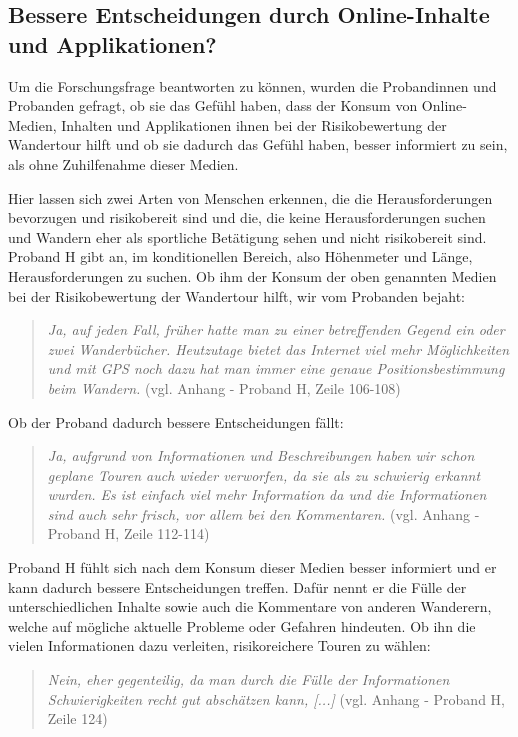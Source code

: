\subsection{Bessere Entscheidungen durch Online-Inhalte und Applikationen?}

Um die Forschungsfrage beantworten zu können, wurden die Probandinnen und Probanden gefragt, ob sie das Gefühl haben, dass der Konsum von Online-Medien, Inhalten und Applikationen ihnen bei der Risikobewertung der Wandertour hilft und ob sie dadurch das Gefühl haben, besser informiert zu sein, als ohne Zuhilfenahme dieser Medien.

Hier lassen sich zwei Arten von Menschen erkennen, die die Herausforderungen bevorzugen und risikobereit sind und die, die keine Herausforderungen suchen und Wandern eher als sportliche Betätigung sehen und nicht risikobereit sind. Proband H gibt an, im konditionellen Bereich, also Höhenmeter und Länge, Herausforderungen zu suchen. Ob ihm der Konsum der oben genannten Medien bei der Risikobewertung der Wandertour hilft, wir vom Probanden bejaht:

\begin{quote}
	\textit{\glqq Ja, auf jeden Fall, früher hatte man zu einer betreffenden Gegend ein oder zwei Wanderbücher. Heutzutage bietet das Internet viel mehr Möglichkeiten und mit GPS noch dazu hat man immer eine genaue Positionsbestimmung beim Wandern.\grqq} (vgl. Anhang - Proband H, Zeile 106-108)
\end{quote}

Ob der Proband dadurch bessere Entscheidungen fällt:

\begin{quote}
	\textit{\glqq Ja, aufgrund von Informationen und Beschreibungen haben wir schon geplane Touren auch wieder verworfen, da sie als zu schwierig erkannt wurden. Es ist einfach viel mehr Information da und die Informationen sind auch sehr frisch, vor allem bei den Kommentaren.\grqq} (vgl. Anhang - Proband H, Zeile 112-114)
\end{quote}

Proband H fühlt sich nach dem Konsum dieser Medien besser informiert und er kann dadurch bessere Entscheidungen treffen. Dafür nennt er die Fülle der unterschiedlichen Inhalte sowie auch die Kommentare von anderen Wanderern, welche auf mögliche aktuelle Probleme oder Gefahren hindeuten. Ob ihn die vielen Informationen dazu verleiten, risikoreichere Touren zu wählen:

\begin{quote}
	\textit{\glqq Nein, eher gegenteilig, da man durch die Fülle der Informationen Schwierigkeiten recht gut abschätzen kann, [...]\grqq} (vgl. Anhang - Proband H, Zeile 124)
\end{quote}

